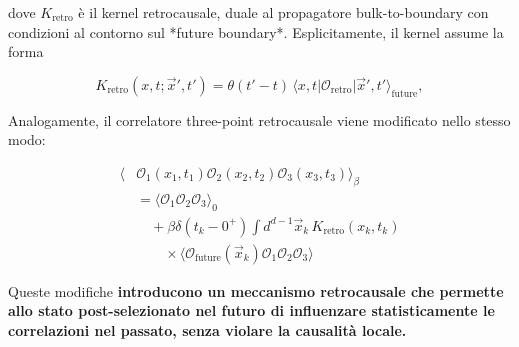 \documentclass[11pt,a4paper]{article}
\theoremstyle{plain}
\theoremstyle{definition}
\begin{document}
\vspace{0.3cm}

dove $K_{\text{retro}}$ è il kernel retrocausale, duale al propagatore bulk-to-boundary con condizioni al contorno sul *future boundary*. Esplicitamente, il kernel assume la forma

\begin{tcolorbox}[
  colback=violet!3!white, 
  colframe=violet!70!black, 
  title=Kernel retrocausale, 
  fonttitle=\bfseries,
  breakable,
  enhanced,
  width=\textwidth,
  boxrule=0.8pt,
  arc=5pt
]
\begin{equation}
K_{\text{retro}}(x,t;\vec{x}',t') = \theta(t' - t) \, \langle x,t | \mathcal{O}_{\text{retro}} | \vec{x}',t' \rangle_{\text{future}},
\label{eq:retro_kernel_two_point}
\end{equation}
\end{tcolorbox}

\clearpage

Analogamente, il correlatore three-point retrocausale viene modificato nello stesso modo:


\vspace{0.3cm}

\begin{tcolorbox}[
  colback=cyan!3!white, 
  colframe=cyan!50!black, 
  title=Correlatore three-point retrocausale, 
  fonttitle=\bfseries,
  breakable,
  enhanced,
  width=\textwidth,
  boxrule=0.8pt,
  arc=5pt
]
\begin{equation}
\begin{aligned}
\langle &\mathcal{O}_1(x_1,t_1) \mathcal{O}_2(x_2,t_2) \mathcal{O}_3(x_3,t_3) \rangle_{\beta} \\
&= \langle \mathcal{O}_1 \mathcal{O}_2 \mathcal{O}_3 \rangle_0 \\
&\quad + \beta \delta(t_k-0^+) \int d^{d-1}\vec{x}_k \, K_{\text{retro}}(x_k,t_k) \\
&\qquad \times \langle \mathcal{O}_{\text{future}}(\vec{x}_k) \mathcal{O}_1 \mathcal{O}_2 \mathcal{O}_3 \rangle
\end{aligned}
\label{eq:three_point_retro}
\end{equation}
\end{tcolorbox}

\vspace{0.3cm}

Queste modifiche \textbf{introducono un meccanismo retrocausale che permette allo stato post-selezionato nel futuro di influenzare statisticamente le correlazioni nel passato, senza violare la causalità locale.} 
\end{document}
